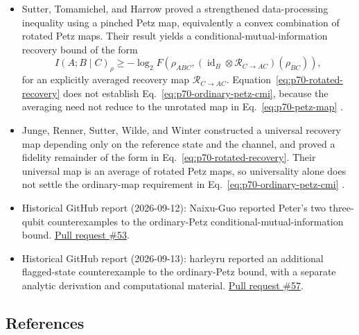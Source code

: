 \begin{itemize}
  \item Sutter, Tomamichel, and Harrow proved a strengthened data-processing
  inequality using a pinched Petz map, equivalently a convex combination of
  rotated Petz maps.  Their result yields a conditional-mutual-information
  recovery bound of the form
  \begin{equation}
    I(A;B\mid C)_\rho
    \geq-\log_2 F\!\left(
      \rho_{ABC},
      (\operatorname{id}_B\otimes\mathcal R_{C\to AC})(\rho_{BC})
    \right),
    \label{eq:p70-rotated-recovery}
  \end{equation}
  for an explicitly averaged recovery map $\mathcal R_{C\to AC}$.
  Equation~\eqref{eq:p70-rotated-recovery} does not establish
  Eq.~\eqref{eq:p70-ordinary-petz-cmi}, because the averaging need not reduce
  to the unrotated map in Eq.~\eqref{eq:p70-petz-map}
  .

  \item Junge, Renner, Sutter, Wilde, and Winter constructed a universal
  recovery map depending only on the reference state and the channel, and
  proved a fidelity remainder of the form in
  Eq.~\eqref{eq:p70-rotated-recovery}.  Their universal map is an average of
  rotated Petz maps, so universality alone does not settle the ordinary-map
  requirement in Eq.~\eqref{eq:p70-ordinary-petz-cmi}
  .

  \item Historical GitHub report (2026-09-12): Naixu-Guo reported Peter's two three-qubit counterexamples to the ordinary-Petz conditional-mutual-information bound. \href{https://github.com/Naixu-Guo/quantum-open-problems/pull/53}{Pull request \#53}.

  \item Historical GitHub report (2026-09-13): harleyru reported an additional flagged-state counterexample to the ordinary-Petz bound, with a separate analytic derivation and computational material. \href{https://github.com/Naixu-Guo/quantum-open-problems/pull/57}{Pull request \#57}.
\end{itemize}

\subsection*{References}

